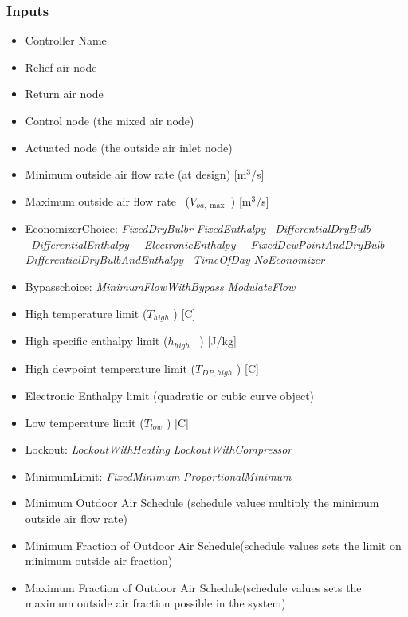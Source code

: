 \subsubsection{Inputs}\label{inputs}

\begin{itemize}
\item
  Controller Name
\item
  Relief air node
\item
  Return air node
\item
  Control node (the mixed air node)
\item
  Actuated node (the outside air inlet node)
\item
  Minimum outside air flow rate (at design) {[}m\(^{3}\)/s{]}
\item
  Maximum outside air flow rate~ (\({\dot V_{oa,\max }}\) ) {[}m\(^{3}\)/s{]}
\item
  EconomizerChoice: \emph{FixedDryBulbr} \textbar{} \emph{FixedEnthalpy} \textbar{} \emph{~DifferentialDryBulb~} \textbar{} \emph{~DifferentialEnthalpy} \textbar{} \emph{~~ElectronicEnthalpy} \textbar{} \emph{~~FixedDewPointAndDryBulb~~~} \textbar{} \emph{DifferentialDryBulbAndEnthalpy~} \textbar{} \emph{TimeOfDay} \textbar{} \emph{NoEconomizer}
\item
  Bypasschoice: \emph{MinimumFlowWithBypass} \textbar{} \emph{ModulateFlow}
\item
  High temperature limit (\({T_{high}}\) ) {[}C{]}
\item
  High specific enthalpy limit (\({h_{high}}\) ~) {[}J/kg{]}
\item
  High dewpoint temperature limit (\({T_{DP,high}}\) ) {[}C{]}
\item
  Electronic Enthalpy limit (quadratic or cubic curve object)
\item
  Low temperature limit (\({T_{low}}\) ) {[}C{]}
\item
  Lockout: \emph{LockoutWithHeating} \textbar{} \emph{LockoutWithCompressor}
\item
  MinimumLimit: \emph{FixedMinimum} \textbar{} \emph{ProportionalMinimum}
\item
  Minimum Outdoor Air Schedule (schedule values multiply the minimum outside air flow rate)
\item
  Minimum Fraction of Outdoor Air Schedule(schedule values sets the limit on minimum outside air fraction)
\item
  Maximum Fraction of Outdoor Air Schedule(schedule values sets the maximum outside air fraction possible in the system)

\end{itemize}
